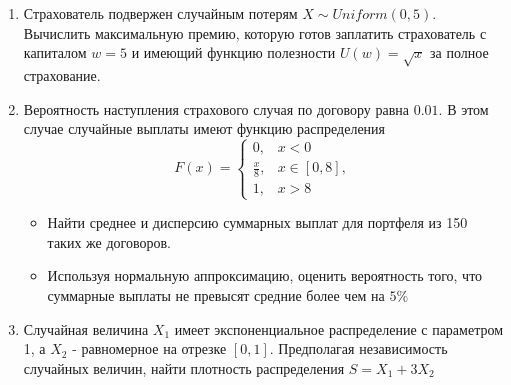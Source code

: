 \documentclass[12pt, letterpaper]{article}
\begin{document}
\begin{enumerate}
	\item 	
	Страхователь подвержен случайным потерям $X \sim Uniform(0, 5)$.
	Вычислить максимальную премию, которую готов заплатить страхователь с капиталом $w=5$ и имеющий функцию полезности $U(w) = \sqrt{x}$ за полное страхование.

	\item
	Вероятность наступления страхового случая по договору равна $0.01$. В этом случае случайные выплаты имеют функцию распределения
	\[
	F(x) = 
	\begin{cases}
		0, & x < 0\\
		\frac{x}{8}, & x \in [0, 8],\\
		1, & x > 8
	\end{cases}
	\]
	\begin{itemize}
		\item Найти среднее и дисперсию суммарных выплат для портфеля из 150 таких же договоров.
		\item Используя нормальную аппроксимацию, оценить вероятность того, что суммарные выплаты не превысят средние более чем на $5\%$
	\end{itemize}
	

	\item
	Случайная величина $X_1$ имеет экспоненциальное распределение с параметром 1, а $X_2$ - равномерное на отрезке $[0, 1]$.
	Предполагая независимость случайных величин, найти плотность распределения $S = X_1 + 3X_2$
\end{enumerate}
\end{document}
